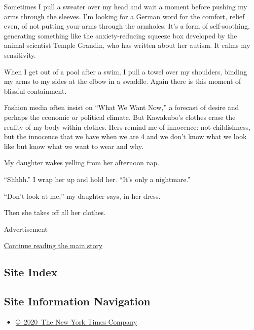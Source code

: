 Sometimes I pull a sweater over my head and wait a moment before pushing
my arms through the sleeves. I'm looking for a German word for the
comfort, relief even, of not putting your arms through the armholes.
It's a form of self-soothing, generating something like the
anxiety-reducing squeeze box developed by the animal scientist Temple
Grandin, who has written about her autism. It calms my sensitivity.

When I get out of a pool after a swim, I pull a towel over my shoulders,
binding my arms to my sides at the elbow in a swaddle. Again there is
this moment of blissful containment.

Fashion media often insist on ``What We Want Now,'' a forecast of desire
and perhaps the economic or political climate. But Kawakubo's clothes
erase the reality of my body within clothes. Hers remind me of
innocence: not childishness, but the innocence that we have when we are
4 and we don't know what we look like but know what we want to wear and
why.

My daughter wakes yelling from her afternoon nap.

``Shhhh.'' I wrap her up and hold her. ``It's only a nightmare.''

``Don't look at me,'' my daughter says, in her dress.

Then she takes off all her clothes.

Advertisement

\protect\hyperlink{after-bottom}{Continue reading the main story}

\hypertarget{site-index}{%
\subsection{Site Index}\label{site-index}}

\hypertarget{site-information-navigation}{%
\subsection{Site Information
Navigation}\label{site-information-navigation}}

\begin{itemize}
\tightlist
\item
  \href{https://help.nytimes3xbfgragh.onion/hc/en-us/articles/115014792127-Copyright-notice}{©~2020~The
  New York Times Company}
\end{itemize}

